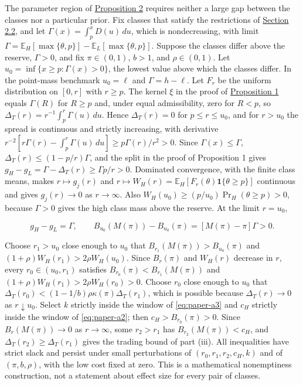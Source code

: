 The parameter region of \hyperref[result-proposition-2]{Proposition 2}
requires neither a large gap between the classes nor a particular prior.
Fix classes that satisfy the restrictions of
\hyperref[sec-values-preparation-and-the-sale]{Section 2.2}, and let
\(\Gamma(x)=\int_p^xD(u)\,du\), which is nondecreasing, with limit
\(\Gamma=\mathbb E_H[\max\{\theta,p\}]-\mathbb E_L[\max\{\theta,p\}]\).
Suppose the classes differ above the reserve, \(\Gamma>0\), and fix
\(\pi\in(0,1)\), \(b>1\), and \(\rho\in(0,1)\). Let
\(u_0=\inf\{x\ge p:\Gamma(x)>0\}\), the lowest value above which the
classes differ. In the point-mass benchmark \(u_0=\ell\) and
\(\Gamma=h-\ell\). Let \(F_r\) be the uniform distribution on \([0,r]\)
with \(r\ge p\). The kernel \(\xi\) in the proof of
\hyperref[result-proposition-1]{Proposition 1} equals \(\Gamma(R)\) for
\(R\ge p\) and, under equal admissibility, zero for \(R<p\), so
\(\Delta_T(r)=r^{-1}\int_p^r\Gamma(u)\,du\). Hence \(\Delta_T(r)=0\) for
\(p\le r\le u_0\), and for \(r>u_0\) the spread is continuous and
strictly increasing, with derivative
\(r^{-2}[r\Gamma(r)-\int_p^r\Gamma(u)\,du]\ge p\Gamma(r)/r^2>0\). Since
\(\Gamma(x)\le\Gamma\), \(\Delta_T(r)\le(1-p/r)\Gamma\), and the split
in the proof of Proposition 1 gives
\(g_H-g_L=\Gamma-\Delta_T(r)\ge\Gamma p/r>0\). Dominated convergence,
with the finite class means, makes \(r\mapsto g_j(r)\) and
\(r\mapsto W_H(r)=\mathbb E_H[F_r(\theta)\mathbf1\{\theta\ge p\}]\)
continuous and gives \(g_j(r)\to0\) as \(r\to\infty\). Also
\(W_H(u_0)\ge(p/u_0)\Pr_H(\theta\ge p)>0\), because \(\Gamma>0\) gives
the high class mass above the reserve. At the limit \(r=u_0\),

\[
g_H-g_L=\Gamma,\qquad
B_{u_0}(M(\pi))-B_{u_0}(\pi)=[M(\pi)-\pi]\Gamma>0.
\tag{A.25}\label{eq:paper-a-25}
\]

Choose \(r_1>u_0\) close enough to \(u_0\) that
\(B_{r_1}(M(\pi))>B_{u_0}(\pi)\) and
\((1+\rho)W_H(r_1)>2\rho W_H(u_0)\). Since \(B_r(\pi)\) and \(W_H(r)\)
decrease in \(r\), every \(r_0\in(u_0,r_1)\) satisfies
\(B_{r_0}(\pi)<B_{r_1}(M(\pi))\) and
\((1+\rho)W_H(r_1)>2\rho W_H(r_0)>0\). Choose \(r_0\) close enough to
\(u_0\) that \(\Delta_T(r_0)<(1-1/b)\rho\kappa(\pi)\Delta_T(r_1)\),
which is possible because \(\Delta_T(r)\to0\) as \(r\downarrow u_0\).
Select \(k\) strictly inside the window of \eqref{eq:paper-a3} and
\(c_H\) strictly inside the window of \eqref{eq:paper-a2}; then
\(c_H>B_{r_0}(\pi)>0\). Since \(B_r(M(\pi))\to0\) as \(r\to\infty\),
some \(r_2>r_1\) has \(B_{r_2}(M(\pi))<c_H\), and
\(\Delta_T(r_2)\ge\Delta_T(r_1)\) gives the trading bound of part
(iii). All inequalities have strict slack and persist under small
perturbations of \((r_0,r_1,r_2,c_H,k)\) and of \((\pi,b,\rho)\), with
the low cost fixed at zero. This is a mathematical nonemptiness
construction, not a statement about effect size for every pair of
classes.

